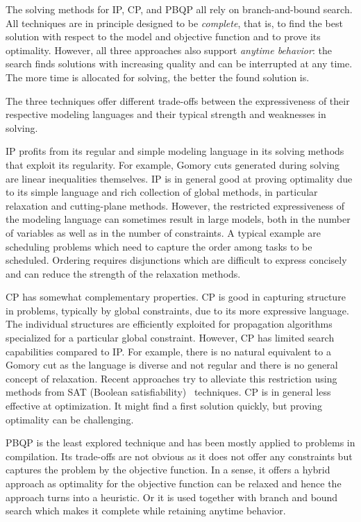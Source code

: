 \documentclass[acmsmall,authorversion,nonacm]{acmart}
\begin{document}
The solving methods for IP, CP, and PBQP all rely on branch-and-bound
search. All techniques are in principle designed to be
\emph{complete}, that is, to find the best solution with respect to
the model and objective function and to prove its optimality. However,
all three approaches also support \emph{anytime behavior}: the search
finds solutions with increasing quality and can be interrupted at any
time. The more time is allocated for solving, the better the found
solution is.

The three techniques offer different trade-offs between the
expressiveness of their respective modeling languages and their
typical strength and weaknesses in solving.

IP profits from its regular and simple modeling language in its
solving methods that exploit its regularity. For example, Gomory cuts
generated during solving are linear inequalities themselves. IP is in
general good at proving optimality due to its simple language and rich
collection of global methods, in particular relaxation and
cutting-plane methods. However, the restricted expressiveness of the
modeling language can sometimes result in large models, both in the
number of variables as well as in the number of constraints. A typical
example are scheduling problems which need to capture the order among
tasks to be scheduled. Ordering requires disjunctions which are
difficult to express concisely and can reduce the strength of the
relaxation methods.

CP has somewhat complementary properties. CP is good in capturing
structure in problems, typically by global constraints, due to its
more expressive language.  The individual structures are efficiently
exploited for propagation algorithms specialized for a particular
global constraint. However, CP has limited search capabilities
compared to IP. For example, there is no natural equivalent to a
Gomory cut as the language is diverse and not regular and there is no
general concept of relaxation. Recent approaches try to alleviate this
restriction using methods from SAT (Boolean
satisfiability)~\cite{lazy-clause} techniques. CP is in general less
effective at optimization. It might find a first solution quickly, but
proving optimality can be challenging.

PBQP is the least explored technique and has been mostly applied to
problems in compilation. Its trade-offs are not obvious as it does not
offer any constraints but captures the problem by the objective
function. In a sense, it offers a hybrid approach as optimality for
the objective function can be relaxed and hence the approach turns
into a heuristic. Or it is used together with branch and bound search
which makes it complete while retaining anytime behavior.
\end{document}
